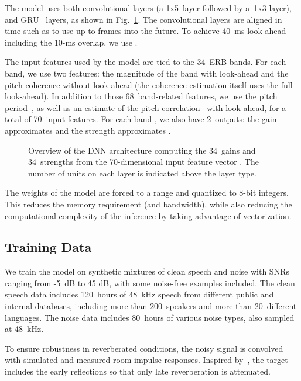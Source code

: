 \documentclass[english]{article}
\begin{document}
\label{sec:DNN-model}

The model uses both convolutional layers (a 1x5~layer followed by
a~1x3 layer), and GRU~\cite{cho2014properties} layers, as shown
in Fig.~\ref{fig:Overview-of-DNN}. The convolutional layers are
aligned in time such as to use up to  frames into the future.
To achieve 40~ms look-ahead including the 10\nobreakdash-ms overlap,
we use .

The input features used by the model are tied to the 34~ERB bands.
For each band, we use two features: the magnitude of the band with
look-ahead  and the pitch coherence without
look-ahead  (the coherence estimation itself
uses the full look-ahead). In addition to those 68~band-related features,
we use the pitch period~, as well as an estimate
of the pitch correlation~\cite{vos2013} with look-ahead, for a total
of 70~input features. For each band , we also have 2~outputs:
the gain  approximates 
and the strength  approximates . 

\begin{figure}


\caption{Overview of the DNN architecture computing the 34~gains 
and 34~strengths  from the 70\protect\nobreakdash-dimensional
input feature vector . The number of units on each layer
is indicated above the layer type.\label{fig:Overview-of-DNN}}


\end{figure}


The weights of the model are forced to a  range and
quantized to 8-bit integers. This reduces the memory requirement (and
bandwidth), while also reducing the computational complexity of the
inference by taking advantage of vectorization. 


\subsection{Training Data}

We train the model on synthetic mixtures of clean speech and noise
with SNRs ranging from -5~dB to 45 dB, with some noise-free examples
included. The clean speech data includes 120~hours of 48~kHz speech
from different public and internal databases, including more than
200~speakers and more than 20~different languages. The noise data
includes 80~hours of various noise types, also sampled at 48~kHz. 

To ensure robustness in reverberated conditions, the noisy signal
is convolved with simulated and measured room impulse responses. Inspired
by~\cite{zhao2018late}, the target includes the early reflections
so that only late reverberation is attenuated.
\end{document}
